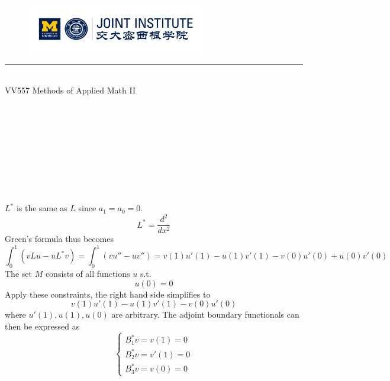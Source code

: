 \documentclass{article}
\begin{document}
\setmainfont{Cormorant Upright}
\renewcommand\arraystretch{1.5}


\thispagestyle{empty}

\begin{center}
\begin{large}
\begin{figure}[!htbp]
\centering
\includegraphics[width=0.7\textwidth]{Logo2}
\end{figure}
\hrule
\vspace*{0.25cm}
 \\
\Large  VV557 Methods of Applied Math II\\
\end{large}
\hrulefill

\vspace*{2cm}
\begin{Large}
 \\
\end{Large}
\vspace*{2cm}
\begin{Large}
\\
\end{Large}
\vspace*{0.5cm}
\begin{large}
 \\
 \\
 \\
\end{large}
\end{center}
\newpage
\setmainfont{Optima}
\setmonofont{Optima}
\setsansfont{Optima}
\setcounter{page}{1}
\normalsize
\section{}
$L^*$ is the same as $L$ since $a_1 = a_0 = 0$.
\[
    L^* = \frac{d^2}{dx^2}
\]
Green's formula thus becomes
\[
	\int_0^1 (vLu-uL^*v) = \int_0^1 (vu''-uv'')=v(1)u'(1)-u(1)v'(1)-v(0)u'(0)+u(0)v'(0)    
\]    
The set $M$ consists of all functions $u$ s.t.
\[
	u(0)=0
\]
Apply these constraints, the right hand side simplifies to
\[
	v(1)u'(1)-u(1)v'(1)-v(0)u'(0)
\]
where $u'(1),u(1),u(0)$ are arbitrary. The adjoint boundary functionals can then be expressed as
\[
\left\{
\begin{array}{c}
B_1^*v = v(1)=0\\
B_2^*v = v'(1)=0\\
B_3^*v = v(0)=0
\end{array}
\right.
\]
\end{document}
